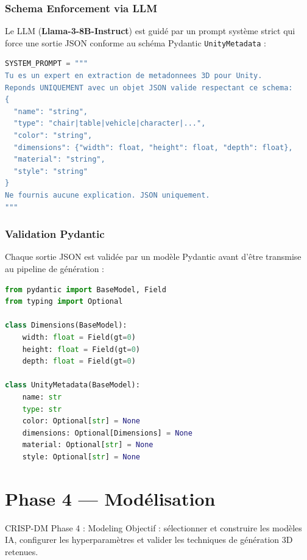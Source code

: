 \documentclass[12pt,a4paper,oneside]{report}
\begin{document}
\subsection{Schema Enforcement via LLM}
Le LLM (\textbf{Llama-3-8B-Instruct}) est guidé par un prompt système strict
qui force une sortie JSON conforme au schéma Pydantic \texttt{UnityMetadata} :

\begin{lstlisting}[language=Python, caption={Prompt système LLM}]
SYSTEM_PROMPT = """
Tu es un expert en extraction de metadonnees 3D pour Unity.
Reponds UNIQUEMENT avec un objet JSON valide respectant ce schema:
{
  "name": "string",
  "type": "chair|table|vehicle|character|...",
  "color": "string",
  "dimensions": {"width": float, "height": float, "depth": float},
  "material": "string",
  "style": "string"
}
Ne fournis aucune explication. JSON uniquement.
"""
\end{lstlisting}

\subsection{Validation Pydantic}
Chaque sortie JSON est validée par un modèle Pydantic avant d'être transmise
au pipeline de génération :

\begin{lstlisting}[language=Python, caption={Modèle Pydantic UnityMetadata}]
from pydantic import BaseModel, Field
from typing import Optional

class Dimensions(BaseModel):
    width: float = Field(gt=0)
    height: float = Field(gt=0)
    depth: float = Field(gt=0)

class UnityMetadata(BaseModel):
    name: str
    type: str
    color: Optional[str] = None
    dimensions: Optional[Dimensions] = None
    material: Optional[str] = None
    style: Optional[str] = None
\end{lstlisting}

\chapter{Phase 4 — Modélisation}

\begin{crispbox}{CRISP-DM Phase 4 : Modeling}
Objectif : sélectionner et construire les modèles IA, configurer les
hyperparamètres et valider les techniques de génération 3D retenues.
\end{crispbox}
\end{document}
